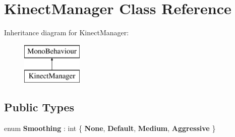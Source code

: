 \hypertarget{class_kinect_manager}{}\section{Kinect\+Manager Class Reference}
\label{class_kinect_manager}
Inheritance diagram for Kinect\+Manager\+:\begin{figure}[H]
\begin{center}
\leavevmode
\includegraphics[height=2.000000cm]{class_kinect_manager}
\end{center}
\end{figure}
\subsection*{Public Types}
\begin{DoxyCompactItemize}
\item 
\mbox{\label{class_kinect_manager_aec17a057770162214385062b140fe969}} 
enum {\bfseries Smoothing} \+: int \{ {\bfseries None}, 
{\bfseries Default}, 
{\bfseries Medium}, 
{\bfseries Aggressive}
 \}
\end{DoxyCompactItemize}
